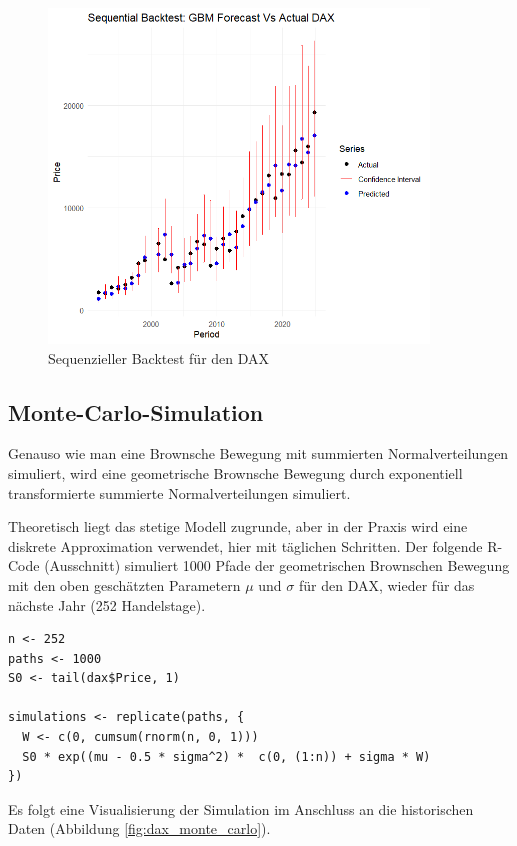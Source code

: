 \begin{figure}[H]
    \centering
    \includegraphics[width=0.9\textwidth]{images/dax_backtest_seq.png}
    \caption{Sequenzieller Backtest für den DAX}
    \label{fig:dax_backtest_seq}
\end{figure}

\subsection{Monte-Carlo-Simulation}

Genauso wie man eine Brownsche Bewegung mit summierten Normalverteilungen simuliert, 
wird eine geometrische Brownsche Bewegung durch exponentiell transformierte
summierte Normalverteilungen simuliert. 


\begin{bsp}
Theoretisch liegt das stetige Modell zugrunde, 
aber in der Praxis wird eine diskrete Approximation verwendet, hier mit täglichen Schritten.
Der folgende R-Code (Ausschnitt) simuliert 1000 Pfade der geometrischen Brownschen Bewegung
mit den oben geschätzten Parametern $\mu$ und $\sigma$ für den DAX, wieder für das nächste Jahr (252 Handelstage).

\begin{lstlisting}
n <- 252
paths <- 1000
S0 <- tail(dax$Price, 1)

simulations <- replicate(paths, {
  W <- c(0, cumsum(rnorm(n, 0, 1)))
  S0 * exp((mu - 0.5 * sigma^2) *  c(0, (1:n)) + sigma * W)
})
\end{lstlisting}
Es folgt eine Visualisierung der Simulation im Anschluss an die historischen Daten (Abbildung \ref{fig:dax_monte_carlo}).
\end{bsp}

